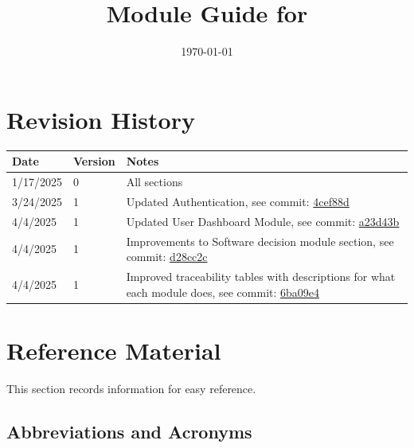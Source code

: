 \documentclass[12pt, titlepage]{article}
\begin{document}
\title{Module Guide for \progname{}} 
\author{\authname}
\date{\today}

\maketitle


\section{Revision History}

\begin{tabularx}{\textwidth}{p{3cm}p{2cm}X}
\toprule {\bf Date} & {\bf Version} & {\bf Notes}\\
\midrule
1/17/2025 & 0 & All sections\\
3/24/2025 & 1 & Updated Authentication, see commit: \href{https://github.com/ausbennett/mes-finance-platform/commit/4cef88de4d7c2a664fa8e2395804251c0a6baeb4}{4cef88d}\\
4/4/2025 & 1 & Updated User Dashboard Module, see commit: \href{https://github.com/ausbennett/mes-finance-platform/commit/a23d43b84b1426d0f6a8d13d3120043a0d8c54b3}{a23d43b}\\
4/4/2025 & 1 & Improvements to Software decision module section, see commit: \href{https://github.com/ausbennett/mes-finance-platform/commit/d28cc2c30433566afcd2b0621950a5832a6cc40e}{d28cc2c}\\
4/4/2025 & 1 & Improved traceability tables with descriptions for what each module does, see commit: \href{https://github.com/ausbennett/mes-finance-platform/commit/6ba09e4a79e3f6a3cf5ef14b3514668898f55438}{6ba09e4}\\
\bottomrule
\end{tabularx}

\newpage

\section{Reference Material}

This section records information for easy reference.

\subsection{Abbreviations and Acronyms}
\end{document}
